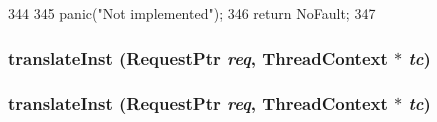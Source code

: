 \begin{DoxyCode}
344 {
345     panic("Not implemented\n");
346     return NoFault;
347 }
\end{DoxyCode}
\hypertarget{classMipsISA_1_1TLB_a072afd8ed455dade4c25a85510e5a4da}{
\subsubsection[{translateInst}]{ translateInst ({\bf RequestPtr} {\em req}, \/  {\bf ThreadContext} $\ast$ {\em tc})}}
\label{classMipsISA_1_1TLB_a072afd8ed455dade4c25a85510e5a4da}
\hypertarget{classMipsISA_1_1TLB_a072afd8ed455dade4c25a85510e5a4da}{
\subsubsection[{translateInst}]{ translateInst ({\bf RequestPtr} {\em req}, \/  {\bf ThreadContext} $\ast$ {\em tc})}}
\label{classMipsISA_1_1TLB_a072afd8ed455dade4c25a85510e5a4da}



